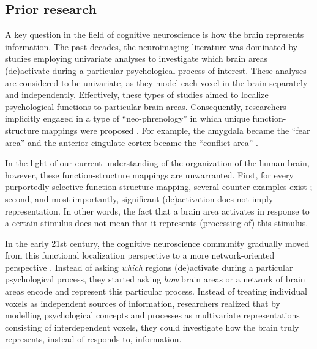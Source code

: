 \documentclass[12pt,a4paper]{article}\usepackage[]{graphicx}\usepackage[]{color}
\begin{document}
\subsection{Prior research}
A key question in the field of cognitive neuroscience is how the brain represents information. The past decades, the neuroimaging literature was dominated by studies employing univariate analyses to investigate which brain areas (de)activate during a particular psychological process of interest. These analyses are considered to be univariate, as they model each voxel in the brain separately and independently. Effectively, these types of studies aimed to localize psychological functions to particular brain areas. Consequently, researchers implicitly engaged in a type of ``neo-phrenology'' in which unique function-structure mappings were proposed \citep{poldrack2010}. For example, the amygdala became the ``fear area'' \citep{ledoux2003} and the anterior cingulate cortex became the ``conflict area'' \citep{vanveen2002}.  

In the light of our current understanding of the organization of the human brain, however, these function-structure mappings are unwarranted. First, for every purportedly selective function-structure mapping, several counter-examples exist \citep{poldrack2010}; second, and most importantly, significant (de)activation does not imply representation. In other words, the fact that a brain area activates in response to a certain stimulus does not mean that it represents (processing of) this stimulus.   

In the early 21st century, the cognitive neuroscience community gradually moved from this functional localization perspective to a more network-oriented perspective \citep{sporns2002,barrett2013}. Instead of asking \emph{which} regions (de)activate during a particular psychological process, they started asking \emph{how} brain areas or a network of brain areas encode and represent this particular process. Instead of treating individual voxels as independent sources of information, researchers realized that by modelling psychological concepts and processes as multivariate representations consisting of interdependent voxels, they could investigate how the brain truly represents, instead of responds to, information.
\end{document}
